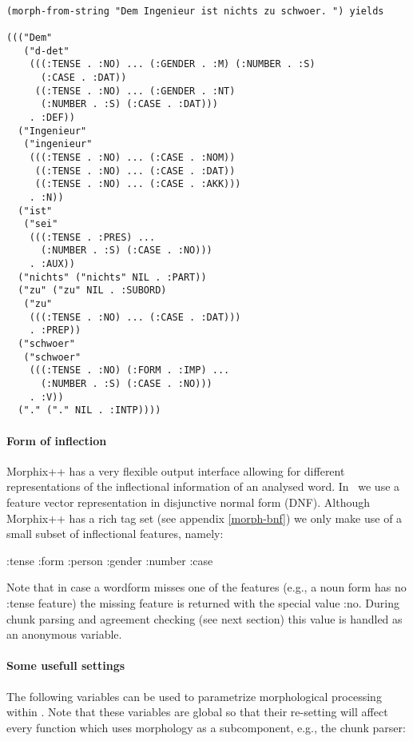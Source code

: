 \begin{verbatim}

(morph-from-string "Dem Ingenieur ist nichts zu schwoer. ") yields

((("Dem"
   ("d-det"
    (((:TENSE . :NO) ... (:GENDER . :M) (:NUMBER . :S)
      (:CASE . :DAT))
     ((:TENSE . :NO) ... (:GENDER . :NT)
      (:NUMBER . :S) (:CASE . :DAT)))
    . :DEF))
  ("Ingenieur"
   ("ingenieur"
    (((:TENSE . :NO) ... (:CASE . :NOM))
     ((:TENSE . :NO) ... (:CASE . :DAT))
     ((:TENSE . :NO) ... (:CASE . :AKK)))
    . :N))
  ("ist"
   ("sei"
    (((:TENSE . :PRES) ...
      (:NUMBER . :S) (:CASE . :NO)))
    . :AUX))
  ("nichts" ("nichts" NIL . :PART))
  ("zu" ("zu" NIL . :SUBORD)
   ("zu"
    (((:TENSE . :NO) ... (:CASE . :DAT)))
    . :PREP))
  ("schwoer"
   ("schwoer"
    (((:TENSE . :NO) (:FORM . :IMP) ...
      (:NUMBER . :S) (:CASE . :NO)))
    . :V))
  ("." ("." NIL . :INTP))))
\end{verbatim}

\paragraph{Form of inflection} Morphix++ has a very flexible output
interface allowing for different representations of the inflectional
information of an analysed word. In \smes\ we use a feature vector
representation in disjunctive normal form (DNF). Although Morphix++ has
a rich tag set (see appendix \ref{morph-bnf}) we only make use of a small
subset of inflectional features, namely:
\begin{center}
{\sc :tense :form :person :gender :number :case}
\end{center}

\noindent Note that in case a wordform misses one of the features (e.g., a
noun form has no {\sc :tense} feature) the missing feature is returned with
the special value {\sc :no}. During chunk parsing and agreement checking (see
next section) this value is handled as an anonymous variable.

\paragraph{Some usefull settings}
The following variables can be used to parametrize morphological
processing within \smes. Note that these variables are global so that
their re-setting will affect every function which uses morphology as a
subcomponent, e.g., the chunk parser:
\vspace{5mm}

